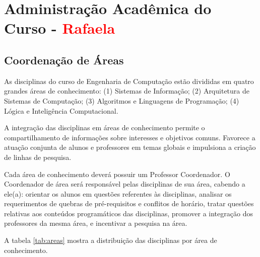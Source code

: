 \section{Administração Acadêmica do Curso - \textcolor{red}{Rafaela}}

\subsection{Coordenação de Áreas}

As disciplinas do curso de Engenharia de Computação estão divididas em quatro grandes áreas de conhecimento: (1) Sistemas de Informação; (2) Arquitetura de Sistemas de Computação; (3) Algoritmos e Linguagens de Programação; (4) Lógica e Inteligência Computacional.

A integração das disciplinas em áreas de conhecimento permite o compartilhamento de informações sobre interesses e objetivos comuns. Favorece a atuação conjunta de alunos e professores em temas globais e impulsiona a criação de linhas de pesquisa.

Cada área de conhecimento deverá possuir um Professor Coordenador. O Coordenador de área será responsável pelas disciplinas de sua área, cabendo a ele(a): orientar os alunos em questões referentes às disciplinas, analisar os requerimentos de quebras de pré-requisitos e conflitos de horário, tratar questões relativas aos conteúdos programáticos das disciplinas, promover a integração dos professores da mesma área, e  incentivar a pesquisa na área.

A tabela \ref{tab:areas} mostra a distribuição das disciplinas por área de conhecimento.


